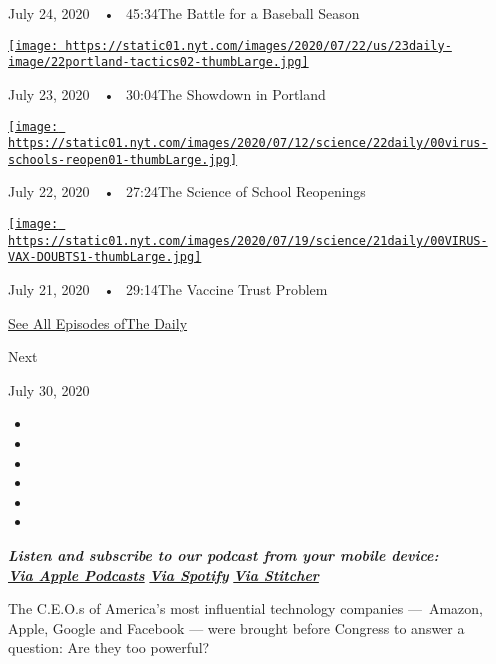 July 24, 2020~~•~ 45:34The Battle for a Baseball Season

\href{https://www.nytimes.com/2020/07/23/podcasts/the-daily/portland-protests.html?action=click\&module=audio-series-bar\&region=header\&pgtype=Article}{\texttt{[image: https://static01.nyt.com/images/2020/07/22/us/23daily-image/22portland-tactics02-thumbLarge.jpg]}}

July 23, 2020~~•~ 30:04The Showdown in Portland

\href{https://www.nytimes.com/2020/07/22/podcasts/the-daily/school-reopenings-coronavirus.html?action=click\&module=audio-series-bar\&region=header\&pgtype=Article}{\texttt{[image: https://static01.nyt.com/images/2020/07/12/science/22daily/00virus-schools-reopen01-thumbLarge.jpg]}}

July 22, 2020~~•~ 27:24The Science of School Reopenings

\href{https://www.nytimes.com/2020/07/21/podcasts/the-daily/coronavirus-vaccine.html?action=click\&module=audio-series-bar\&region=header\&pgtype=Article}{\texttt{[image: https://static01.nyt.com/images/2020/07/19/science/21daily/00VIRUS-VAX-DOUBTS1-thumbLarge.jpg]}}

July 21, 2020~~•~ 29:14The Vaccine Trust Problem

\href{https://www.nytimes.com/column/the-daily}{See All Episodes ofThe
Daily}

Next

July 30, 2020

\begin{itemize}
\item
\item
\item
\item
\item
\item
\end{itemize}

\emph{\textbf{Listen and subscribe to our podcast from your mobile
device:}}\\
\textbf{\href{https://itunes.apple.com/us/podcast/the-daily/id1200361736?mt=2}{\emph{Via
Apple Podcasts}}} \emph{\textbf{\textbar{}}}
\textbf{\href{https://open.spotify.com/show/3IM0lmZxpFAY7CwMuv9H4g?si=SfuMSC55R1qprFsRZU3_zw}{\emph{Via
Spotify}}} \emph{\textbf{\textbar{}}}
\textbf{\href{http://www.stitcher.com/podcast/the-new-york-times/the-daily-10}{\emph{Via
Stitcher}}}

The C.E.O.s of America's most influential technology companies
---~Amazon, Apple, Google and Facebook --- were brought before Congress
to answer a question: Are they too powerful?

